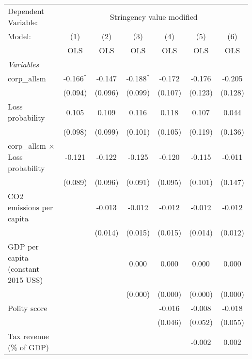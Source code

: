 
\begingroup
\centering
\begin{tabular}{lcccccc}
   \toprule
   Dependent Variable: & \multicolumn{6}{c}{Stringency value modified}\\
   Model:                                  & (1)          & (2)     & (3)          & (4)     & (5)     & (6)\\  
                                           &  OLS         & OLS     & OLS          & OLS     & OLS     & OLS\\  
   \midrule
   \emph{Variables}\\
   corp\_allsm                             & -0.166$^{*}$ & -0.147  & -0.188$^{*}$ & -0.172  & -0.176  & -0.205\\   
                                           & (0.094)      & (0.096) & (0.099)      & (0.107) & (0.123) & (0.128)\\   
   Loss probability                        & 0.105        & 0.109   & 0.116        & 0.118   & 0.107   & 0.044\\   
                                           & (0.098)      & (0.099) & (0.101)      & (0.105) & (0.119) & (0.136)\\   
   corp\_allsm $\times$ Loss probability   & -0.121       & -0.122  & -0.125       & -0.120  & -0.115  & -0.011\\   
                                           & (0.089)      & (0.096) & (0.091)      & (0.095) & (0.101) & (0.147)\\   
   CO2 emissions per capita                &              & -0.013  & -0.012       & -0.012  & -0.012  & -0.012\\   
                                           &              & (0.014) & (0.015)      & (0.015) & (0.014) & (0.012)\\   
   GDP per capita (constant 2015 US\$)     &              &         & 0.000        & 0.000   & 0.000   & 0.000\\   
                                           &              &         & (0.000)      & (0.000) & (0.000) & (0.000)\\   
   Polity score                            &              &         &              & -0.016  & -0.008  & -0.018\\   
                                           &              &         &              & (0.046) & (0.052) & (0.055)\\   
   Tax revenue (\% of GDP)                 &              &         &              &         & -0.002  & 0.002\\   

\end{tabular}

